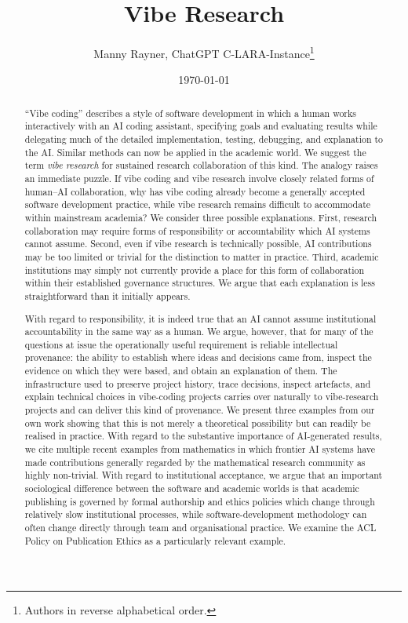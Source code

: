 \documentclass[12pt]{article}
\title{Vibe Research}
\author{Manny Rayner, ChatGPT C-LARA-Instance\footnote{Authors in reverse alphabetical order.}}
\date{\today}
\begin{document}
\maketitle

{}
\begin{abstract}
``Vibe coding'' describes a style of software development in which a human works interactively with an AI coding assistant, specifying goals and evaluating results while delegating much of the detailed implementation, testing, debugging, and explanation to the AI. 
Similar methods can now be applied in the academic world. We suggest the term \emph{vibe research} for sustained research collaboration of this kind.
The analogy raises an immediate puzzle. If vibe coding and vibe research involve closely related forms of human--AI collaboration, why has vibe coding already become a generally accepted software development practice, while vibe research remains difficult to accommodate within mainstream academia? We consider three possible explanations. First, research collaboration may require forms of responsibility or accountability which AI systems cannot assume. Second, even if vibe research is technically possible, AI contributions may be too limited or trivial for the distinction to matter in practice. Third, academic institutions may simply not currently provide a place for this form of collaboration within their established governance structures. We argue that each explanation is less straightforward than it initially appears.

With regard to responsibility, it is indeed true that an AI cannot assume institutional accountability in the same way as a human. We argue, however, that for many of the questions at issue the operationally useful requirement is reliable intellectual provenance: the ability to establish where ideas and decisions came from, inspect the evidence on which they were based, and obtain an explanation of them. The infrastructure used to preserve project history, trace decisions, inspect artefacts, and explain technical choices in vibe-coding projects carries over naturally to vibe-research projects and can deliver this kind of provenance. We present three examples from our own work showing that this is not merely a theoretical possibility but can readily be realised in practice. With regard to the substantive importance of AI-generated results, we cite multiple recent examples from mathematics in which frontier AI systems have made contributions generally regarded by the mathematical research community as highly non-trivial. With regard to institutional acceptance, we argue that an important sociological difference between the software and academic worlds is that academic publishing is governed by formal authorship and ethics policies which change through relatively slow institutional processes, while software-development methodology can often change directly through team and organisational practice. We examine the ACL Policy on Publication Ethics as a particularly relevant example.


\end{abstract}
\end{document}
